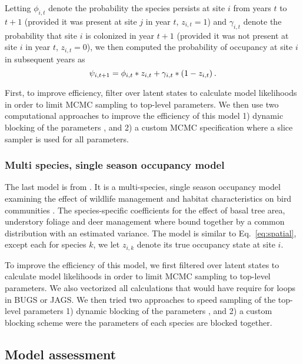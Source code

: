 \documentclass[12pt]{article}
\begin{document}
Letting $\phi_{i,t}$ denote the probability the species persists at
site $i$ from years $t$ to $t+1$ (provided it was present at site $j$
in year $t$, $z_{i,t}=1$) and $\gamma_{i,t}$ denote the
probability that site $i$ is colonized in year $t+1$
(provided it was not present at site $i$ in year $t$, $z_{i,t}=0$),
we then computed the probability of occupancy  at site
$i$ in subsequent years as
%
\begin{equation}
  \label{eq:occupancy2}
  \psi_{i,t+1} =
  \phi_{i,t} * z_{i,t} + \gamma_{i,t} * (1-z_{i,t})\hspace{0.2em}.
\end{equation}
%

First, to improve efficiency, filter over latent states
to calculate model likelihoods in order to limit MCMC sampling to
top-level parameters. We then use two computational approaches to
improve the efficiency of this model 1) dynamic blocking of the
parameters \citep{turek2016efficient}, and 2) a custom MCMC
specification where a slice sampler is used for all parameters.

\subsubsection*{Multi species, single season occupancy model}
\label{sec:msss}

The last model is from \citep{zipkin2010multi}. It is a multi-species,
single season occupancy model examining the effect of wildlife
management and habitat characteristics on bird communities
\citep{zipkin2010multi}. The species-specific coefficients for the
effect of basal tree area, understory foliage and deer management
where bound together by a common distribution with an estimated
variance. The model is similar to Eq.~\ref{eq:spatial}, except each for
species $k$, we let $z_{i,k}$ denote its true occupancy state at site
$i$.
 
To improve the efficiency of this model, we first filtered over latent
states to calculate model likelihoods in order to limit MCMC sampling
to top-level parameters. We also vectorized all calculations that
would have require for loops in BUGS or JAGS. We then tried two
approaches to speed sampling of the top-level parameters 1) dynamic
blocking of the parameters \citep{turek2016efficient}, and 2) a custom
blocking scheme were the parameters of each species are blocked
together.


\subsection*{Model assessment}
\label{sec:assess}
\end{document}
